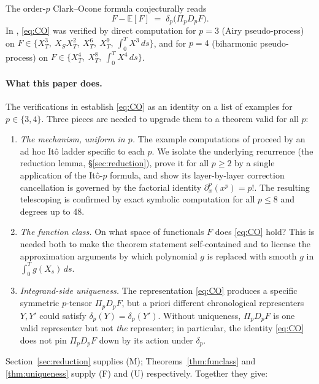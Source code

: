 \documentclass[11pt,reqno]{amsart}
\theoremstyle{plain}
\theoremstyle{definition}
\newcommand{\E}{\mathbb{E}}
\begin{document}
The order-$p$ Clark--Ocone formula conjecturally reads
\begin{equation}
\label{eq:CO}
F - \E[F] \;=\; \delta_p\bigl(\Pi_p D_p F\bigr).
\end{equation}
In \cite[\S 4--5]{operatorDerivativeII}, \eqref{eq:CO} was verified by direct computation for $p=3$ (Airy pseudo-process) on $F \in \{X_T^3,\ X_S X_T^2,\ X_T^6,\ X_T^9,\ \int_0^T X^3\, ds\}$, and for $p=4$ (biharmonic pseudo-process) on $F \in \{X_T^4,\ X_T^8,\ \int_0^T X^4\, ds\}$.

\paragraph{What this paper does.}
The verifications in \cite{operatorDerivativeII} establish \eqref{eq:CO} as an identity on a list of examples for $p \in \{3,4\}$. Three pieces are needed to upgrade them to a theorem valid for all $p$:

\begin{enumerate}
\item[\textbf{(M)}] \emph{The mechanism, uniform in $p$.} The example computations of \cite{operatorDerivativeII} proceed by an ad hoc Itô ladder specific to each $p$. We isolate the underlying recurrence (the reduction lemma, \S\ref{sec:reduction}), prove it for all $p \geq 2$ by a single application of the Itô-$p$ formula, and show its layer-by-layer correction cancellation is governed by the factorial identity $\partial_x^p(x^p)=p!$. The resulting telescoping is confirmed by exact symbolic computation for all $p \leq 8$ and degrees up to $48$.
\item[\textbf{(F)}] \emph{The function class.} On what space of functionals $F$ does \eqref{eq:CO} hold? This is needed both to make the theorem statement self-contained and to license the approximation arguments by which polynomial $g$ is replaced with smooth $g$ in $\int_0^T g(X_s)\, ds$.
\item[\textbf{(U)}] \emph{Integrand-side uniqueness.} The representation \eqref{eq:CO} produces a specific symmetric $p$-tensor $\Pi_p D_p F$, but a priori different chronological representers $Y, Y'$ could satisfy $\delta_p(Y) = \delta_p(Y')$. Without uniqueness, $\Pi_p D_p F$ is one valid representer but not \emph{the} representer; in particular, the identity \eqref{eq:CO} does not pin $\Pi_p D_p F$ down by its action under $\delta_p$.
\end{enumerate}

Section~\ref{sec:reduction} supplies (M); Theorems~\ref{thm:funclass} and \ref{thm:uniqueness} supply (F) and (U) respectively. Together they give:
\end{document}

